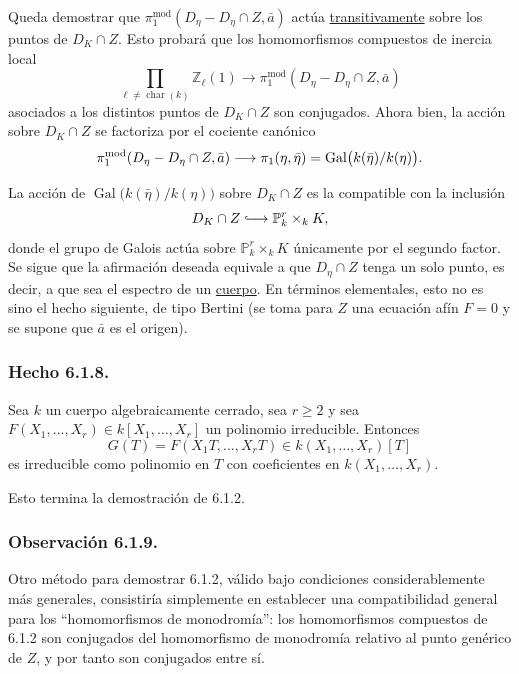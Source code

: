Queda demostrar que
$\pi_1^{\mathrm{mod}}(D_\eta-D_\eta\cap Z,\bar a)$ actúa
\underline{transitivamente} sobre los puntos de $D_K\cap Z$. Esto
probará que los homomorfismos compuestos de inercia local
\[
\prod_{\ell\ne\operatorname{char}(k)}\mathbb Z_\ell(1)
\longrightarrow
\pi_1^{\mathrm{mod}}(D_\eta-D_\eta\cap Z,\bar a)
\]
asociados a los distintos puntos de $D_K\cap Z$ son conjugados. Ahora
bien, la acción sobre $D_K\cap Z$ se factoriza por el cociente canónico
\[
\pi_1^{\mathrm{mod}}(D_\eta-D_\eta\cap Z,\bar a)
\longrightarrow
\pi_1(\eta,\bar\eta)
=\sisi{\operatorname{Gal}(\,/k(\eta))}
{\operatorname{Gal}\bigl(k(\bar\eta)/k(\eta)\bigr)}.
\]

\pageoriginale

La acción de
$\operatorname{Gal}\bigl(k(\bar\eta)/k(\eta)\bigr)$ sobre
$D_K\cap Z$ es la compatible con la inclusión
\[
D_K\cap Z\lhook\joinrel\longrightarrow\mathbb P^r_k\times_k K,
\]
donde el grupo de Galois actúa sobre $\mathbb P^r_k\times_k K$
únicamente por el segundo factor. Se sigue que la afirmación deseada
equivale a que $D_\eta\cap Z$ tenga un solo punto, es decir, a que sea
el espectro de un \underline{cuerpo}. En términos elementales, esto no
es sino el hecho siguiente, de tipo Bertini (se toma para $Z$ una
ecuación afín $F=0$ y se supone que $\bar a$ es el origen).

\subsubsection*{Hecho 6.1.8.}

Sea $k$ un cuerpo algebraicamente cerrado, sea $r\ge2$ y sea
$F(X_1,\ldots,X_r)\in k[X_1,\ldots,X_r]$ un polinomio irreducible.
Entonces
\[
G(T)=F(X_1T,\ldots,X_rT)\in k(X_1,\ldots,X_r)[T]
\]
es irreducible como polinomio en $T$ con coeficientes en
$k(X_1,\ldots,X_r)$.

Esto termina la demostración de 6.1.2.

\subsubsection*{Observación 6.1.9.}

Otro método para demostrar 6.1.2, válido bajo condiciones
considerablemente más generales, consistiría simplemente en establecer
una compatibilidad general para los ``homomorfismos de monodromía'':
los homomorfismos compuestos de 6.1.2 son conjugados del homomorfismo de
monodromía relativo al punto genérico de $Z$, y por tanto son conjugados
entre sí.

